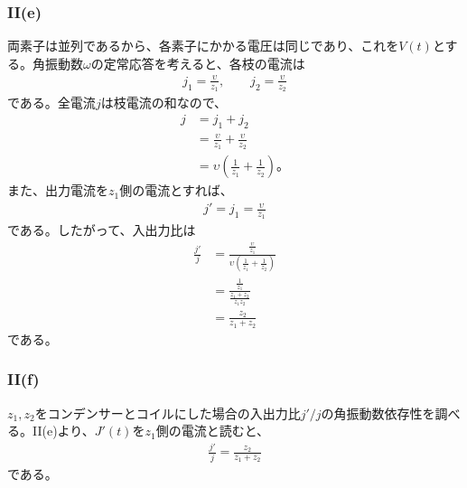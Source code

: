 \documentclass[platex,dvipdfmx,a4paper]{jsarticle}
\begin{document}
  \subsubsection*{II(e)}
  両素子は並列であるから、各素子にかかる電圧は同じであり、これを$V(t)$とする。角振動数$\omega$の定常応答を考えると、各枝の電流は
  \begin{align*}
    j_1=\frac{\upsilon}{z_1},\qquad
    j_2=\frac{\upsilon}{z_2}
  \end{align*}
  である。全電流$j$は枝電流の和なので、
  \begin{align*}
    j
    &=j_1+j_2 \\
    &=\frac{\upsilon}{z_1}+\frac{\upsilon}{z_2} \\
    &=\upsilon\left(\frac{1}{z_1}+\frac{1}{z_2}\right)。
  \end{align*}
  また、出力電流を$z_1$側の電流とすれば、
  \begin{align*}
    j'=j_1=\frac{\upsilon}{z_1}
  \end{align*}
  である。したがって、入出力比は
  \begin{align*}
    \frac{j'}{j}
    &=\frac{\frac{\upsilon}{z_1}}{\upsilon\left(\frac{1}{z_1}+\frac{1}{z_2}\right)} \\
    &=\frac{\frac{1}{z_1}}{\frac{z_1+z_2}{z_1z_2}} \\
    &=\frac{z_2}{z_1+z_2}
  \end{align*}
  である。

  \subsubsection*{II(f)}

  $z_1,z_2$をコンデンサーとコイルにした場合の入出力比$j'/j$の角振動数依存性を調べる。II(e)より、$J'(t)$を$z_1$側の電流と読むと、
  \begin{align*}
    \frac{j'}{j}=\frac{z_2}{z_1+z_2}
  \end{align*}
  である。
\end{document}
